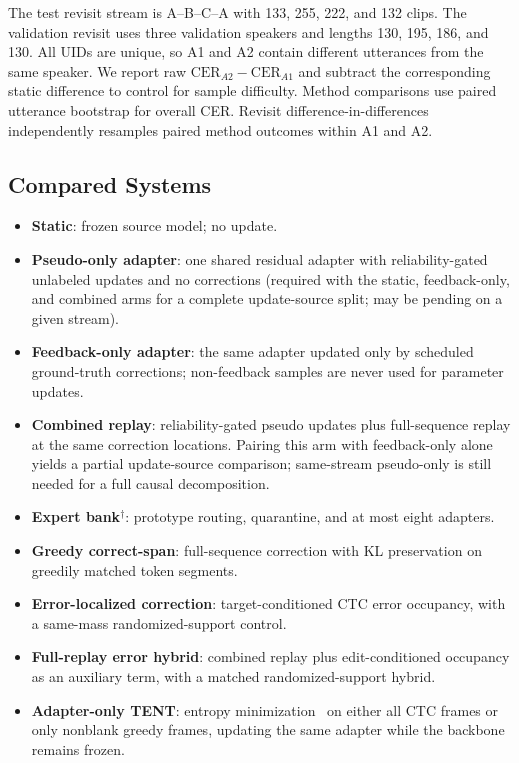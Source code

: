 The test revisit stream is A--B--C--A with 133, 255, 222, and 132 clips. The validation revisit uses three validation speakers and lengths 130, 195, 186, and 130. All UIDs are unique, so A1 and A2 contain different utterances from the same speaker. We report raw $\mathrm{CER}_{A2}-\mathrm{CER}_{A1}$ and subtract the corresponding static difference to control for sample difficulty. Method comparisons use paired utterance bootstrap for overall CER. Revisit difference-in-differences independently resamples paired method outcomes within A1 and A2.

\subsection{Compared Systems}

\begin{itemize}
  \item \textbf{Static}: frozen source model; no update.
  \item \textbf{Pseudo-only adapter}: one shared residual adapter with reliability-gated unlabeled updates and no corrections (required with the static, feedback-only, and combined arms for a complete update-source split; may be pending on a given stream).
  \item \textbf{Feedback-only adapter}: the same adapter updated only by scheduled ground-truth corrections; non-feedback samples are never used for parameter updates.
  \item \textbf{Combined replay}: reliability-gated pseudo updates plus full-sequence replay at the same correction locations. Pairing this arm with feedback-only alone yields a partial update-source comparison; same-stream pseudo-only is still needed for a full causal decomposition.
  \item \textbf{Expert bank$^{\dagger}$}: prototype routing, quarantine, and at most eight adapters.
  \item \textbf{Greedy correct-span}: full-sequence correction with KL preservation on greedily matched token segments.
  \item \textbf{Error-localized correction}: target-conditioned CTC error occupancy, with a same-mass randomized-support control.
  \item \textbf{Full-replay error hybrid}: combined replay plus edit-conditioned occupancy as an auxiliary term, with a matched randomized-support hybrid.
  \item \textbf{Adapter-only TENT}: entropy minimization~\cite{wang2021tent} on either all CTC frames or only nonblank greedy frames, updating the same adapter while the backbone remains frozen.

\end{itemize}
